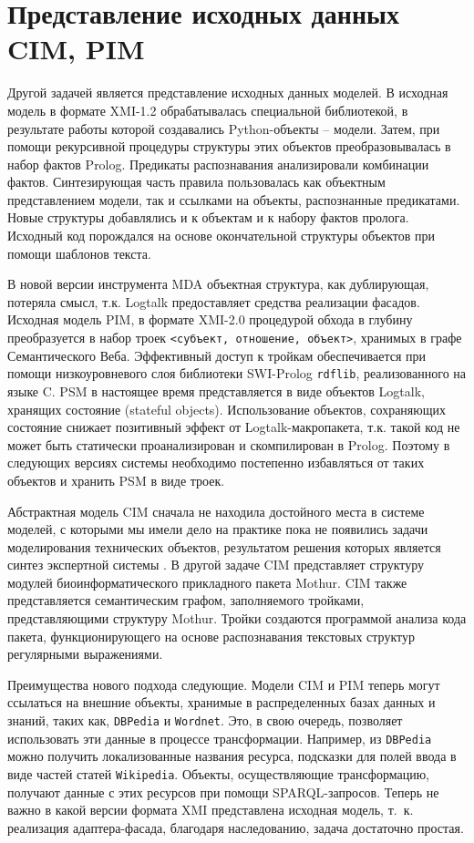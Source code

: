 \documentclass[12pt]{article}
\begin{document}
\section{Представление исходных данных CIM, PIM}

Другой задачей является представление исходных данных моделей.  В \cite{b2} исходная модель в формате XMI-1.2 обрабатывалась специальной библиотекой, в результате работы которой создавались Python-объекты -- модели.  Затем, при помощи рекурсивной процедуры структуры этих объектов преобразовывалась в набор фактов Prolog.  Предикаты распознавания анализировали комбинации фактов.  Синтезирующая часть правила пользовалась как объектным представлением модели, так и ссылками на объекты, распознанные предикатами.  Новые структуры добавлялись и к объектам и к набору фактов пролога.  Исходный код порождался на основе окончательной структуры объектов при помощи шаблонов текста.

В новой версии инструмента MDA объектная структура, как дублирующая, потеряла смысл, т.к. Logtalk предоставляет средства реализации фасадов.  Исходная модель PIM, в формате XMI-2.0 процедурой обхода в глубину преобразуется в набор троек \texttt{<субъект, отношение, объект>}, хранимых в графе Семантического Веба.  Эффективный доступ к тройкам обеспечивается при помощи низкоуровневого слоя библиотеки SWI-Prolog \texttt{rdflib}, реализованного на языке C.  PSM в настоящее время представляется в виде объектов Logtalk, хранящих состояние (stateful objects).  Использование объектов, сохраняющих состояние снижает позитивный эффект от Logtalk-макропакета, т.к. такой код не может быть статически проанализирован и скомпилирован в Prolog.  Поэтому в следующих версиях системы необходимо постепенно избавляться от таких объектов и хранить PSM в виде троек.

Абстрактная модель CIM сначала не находила достойного места в системе моделей, с которыми мы имели дело на практике пока не появились задачи моделирования технических объектов, результатом решения которых является синтез экспертной системы \cite{nikita}.  В другой задаче CIM представляет структуру модулей биоинформатического прикладного пакета Mothur.  CIM также представляется семантическим графом, заполняемого тройками, представляющими структуру Mothur.  Тройки создаются программой анализа кода пакета, функционирующего на основе распознавания текстовых структур регулярными выражениями.

Преимущества нового подхода следующие.  Модели CIM и PIM теперь могут ссылаться на внешние объекты, хранимые в распределенных базах данных и знаний, таких как, \texttt{DBPedia} и \texttt{Wordnet}.  Это, в свою очередь, позволяет использовать эти данные в процессе трансформации.  Например, из \texttt{DBPedia} можно получить локализованные названия ресурса, подсказки для полей ввода в виде частей статей \texttt{Wikipedia}.  Объекты, осуществляющие трансформацию, получают данные с этих ресурсов при помощи SPARQL-запросов.  Теперь не важно в какой версии формата XMI представлена исходная модель, т.~к. реализация адаптера-фасада, благодаря наследованию, задача достаточно простая. %
\end{document}

